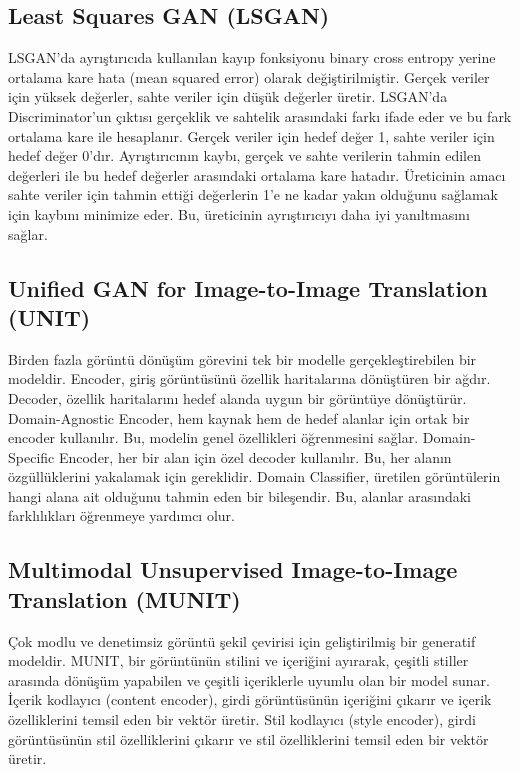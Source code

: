 \subsection{Least Squares GAN (LSGAN)}

LSGAN'da ayrıştırıcıda kullanılan kayıp fonksiyonu binary cross entropy yerine ortalama kare hata (mean squared error) olarak değiştirilmiştir. Gerçek veriler için yüksek değerler, sahte veriler için düşük değerler üretir. LSGAN'da Discriminator'un çıktısı gerçeklik ve sahtelik arasındaki farkı ifade eder ve bu fark ortalama kare ile hesaplanır. Gerçek veriler için hedef değer 1, sahte veriler için hedef değer 0'dır. Ayrıştırıcının kaybı, gerçek ve sahte verilerin tahmin edilen değerleri ile bu hedef değerler arasındaki ortalama kare hatadır. Üreticinin amacı sahte veriler için tahmin ettiği değerlerin 1'e ne kadar yakın olduğunu sağlamak için kaybını minimize eder. Bu, üreticinin ayrıştırıcıyı daha iyi yanıltmasını sağlar.

\subsection{Unified GAN for Image-to-Image Translation (UNIT)}

Birden fazla görüntü dönüşüm görevini tek bir modelle gerçekleştirebilen bir modeldir. Encoder, giriş görüntüsünü özellik haritalarına dönüştüren bir ağdır. Decoder, özellik haritalarını hedef alanda uygun bir görüntüye dönüştürür. Domain-Agnostic Encoder, hem kaynak hem de hedef alanlar için ortak bir encoder kullanılır. Bu, modelin genel özellikleri öğrenmesini sağlar. Domain-Specific Encoder, her bir alan için özel decoder kullanılır. Bu, her alanın özgüllüklerini yakalamak için gereklidir. Domain Classifier, üretilen görüntülerin hangi alana ait olduğunu tahmin eden bir bileşendir. Bu, alanlar arasındaki farklılıkları öğrenmeye yardımcı olur. 

\subsection{Multimodal Unsupervised Image-to-Image Translation (MUNIT)}

Çok modlu ve denetimsiz görüntü şekil çevirisi için geliştirilmiş bir generatif modeldir. MUNIT, bir görüntünün stilini ve içeriğini ayırarak, çeşitli stiller arasında dönüşüm yapabilen ve çeşitli içeriklerle uyumlu olan bir model sunar. İçerik kodlayıcı (content encoder), girdi görüntüsünün içeriğini çıkarır ve içerik özelliklerini temsil eden bir vektör üretir. Stil kodlayıcı (style encoder), girdi görüntüsünün stil özelliklerini çıkarır ve stil özelliklerini temsil eden bir vektör üretir.

